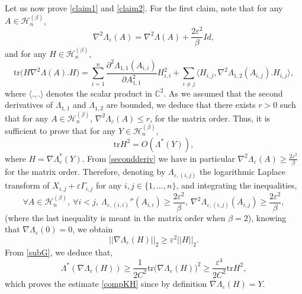 \documentclass[aop,preprint]{imsart}
\newcommand\CC{\mathbb{C}}
\newcommand\tr{\mathrm{tr}}
\newcommand\eps{\varepsilon}
\numberwithin{equation}{section}
\theoremstyle{definition}
\theoremstyle{plain}
\theoremstyle{remark}
\begin{document}
Let us now prove \eqref{claim1} and \eqref{claim2}. For the first claim, note that for any $A\in\mathcal{H}_n^{(\beta)}$, 
\begin{equation}\label{secondderiv}\nabla^2\Lambda_\eps(A)  = \nabla^2 \Lambda(A) + \frac{2\eps^2}{\beta}Id,\end{equation}
and for any $H \in\mathcal{H}_n^{(\beta)}$, 
$$\tr \big( H \nabla^2 \Lambda(A). H\big)  = \sum_{i=1}^n\frac{\partial^2 \Lambda_{1,1}(A_{i,i})}{\partial A_{1,1}^2} H_{i,i}^2 +  \sum_{i\neq j}\langle H_{i,j},\nabla^2 \Lambda_{1,2}(A_{i,j}). H_{i,j}\rangle,$$
where $\langle . , .\rangle$ denotes the scalar product in $\CC^2$. As we assumed that the second derivatives of $\Lambda_{1,1}$ and $\Lambda_{1,2}$ are bounded, we deduce that there exists $r>0$ such that for any $A \in \mathcal{H}_n^{(\beta)}$, $\nabla^2 \Lambda_\eps (A) \leq r$, for the matrix order. 
Thus, it is sufficient to prove that for any $Y\in \mathcal{H}_n^{(\beta)}$,
\begin{equation} \label{compKH} \tr H^2 =O( \Lambda^*(Y)),\end{equation}
where $H=\nabla \Lambda_\eps^*(Y)$. From \eqref{secondderiv} we have in particular $\nabla^2 \Lambda_\eps(A)\geq \frac{2\eps^2}{\beta}$ for the matrix order. Therefore, denoting by $\Lambda_{\eps, (i,j)}$ the logarithmic Laplace transform of $X_{i,j}+\eps \Gamma_{i,j}$ for any $i,j \in \{1,\ldots,n\}$, and integrating the inequalities,
$$\forall A \in \mathcal{H}_n^{(\beta)}, \  \forall i<j, \ \Lambda_{\eps, (i,i)}''(A_{i,i}) \geq \frac{2\eps^2}{\beta}, \ \nabla^2\Lambda_{\eps,(i,j)}(A_{i,j}) \geq \frac{2\eps^2}{\beta},$$
(where the last inequality is meant in the matrix order when $\beta=2$), knowing that $\nabla \Lambda_\eps(0)=0$, we obtain
$$ || \nabla \Lambda_\eps(H) ||_2 \geq \eps^2 || H||_2.$$
From \eqref{subG}, we deduce that,
$$  \Lambda^*(\nabla \Lambda_\eps(H)) \geq \frac{1}{2C^2} \tr \big(\nabla \Lambda_\eps(H)\big)^2\geq \frac{\eps^4}{2C^2} \tr H^2,$$  
which proves the estimate \eqref{compKH} since by definition $\nabla \Lambda_\eps(H) = Y$.
\end{document}
